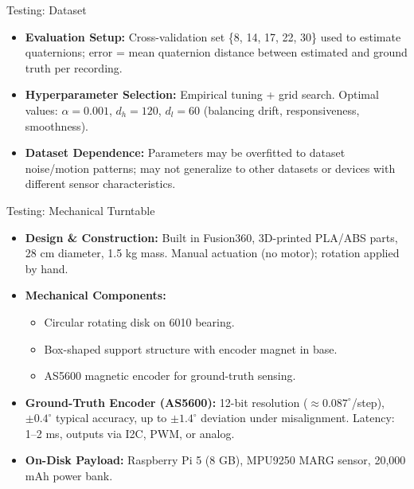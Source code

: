 \documentclass[aspectratio=169,xcolor=dvipsnames]{beamer}
\begin{document}
\begin{frame}{Testing: Dataset}
  \begin{itemize}
    \item \textbf{Evaluation Setup:}  
    Cross-validation set \{8, 14, 17, 22, 30\} used to estimate quaternions; error = mean quaternion distance between estimated and ground truth per recording.
    
    \item \textbf{Hyperparameter Selection:}  
    Empirical tuning + grid search.  
    Optimal values: $\alpha = 0.001$, $d_h = 120$, $d_l = 60$ (balancing drift, responsiveness, smoothness).
    
    \item \textbf{Dataset Dependence:}  
    Parameters may be overfitted to dataset noise/motion patterns; may not generalize to other datasets or devices with different sensor characteristics.
\end{itemize}

\end{frame}

\begin{frame}{Testing: Mechanical Turntable}
  \begin{itemize}
      \item \textbf{Design \& Construction:}  
      Built in Fusion360, 3D-printed PLA/ABS parts, 28 cm diameter, 1.5 kg mass.  
      Manual actuation (no motor); rotation applied by hand.
  
      \item \textbf{Mechanical Components:}  
      \begin{itemize}
          \item Circular rotating disk on 6010 bearing.  
          \item Box-shaped support structure with encoder magnet in base.  
          \item AS5600 magnetic encoder for ground-truth sensing.
      \end{itemize}
  
      \item \textbf{Ground-Truth Encoder (AS5600):}  
      12-bit resolution ($\approx 0.087^{\circ}$/step), $\pm 0.4^{\circ}$ typical accuracy, up to $\pm 1.4^{\circ}$ deviation under misalignment.  
      Latency: 1--2 ms, outputs via I2C, PWM, or analog.
  
      \item \textbf{On-Disk Payload:}  
      Raspberry Pi 5 (8 GB), MPU9250 MARG sensor, 20,000 mAh power bank.
  \end{itemize}
  \end{frame}
\end{document}
